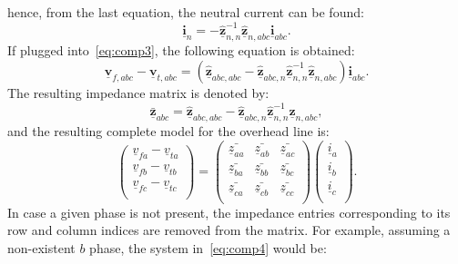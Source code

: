 \documentclass[11pt]{article}
\begin{document}
	hence, from the last equation, the neutral current can be found:
	\begin{equation}
		\underline{\bm{i}}_n = - \underline{\hat{\bm{z}}}_{n,n}^{-1} \underline{\hat{\bm{z}}}_{n,abc} \underline{\bm{i}}_{abc}.
	\end{equation}
	If plugged into~\eqref{eq:comp3}, the following equation is obtained:
	\begin{equation}
		\underline{\bm{v}}_{f,abc} - \underline{\bm{v}}_{t,abc} = (\underline{\hat{\bm{z}}}_{abc,abc}  - \underline{\hat{\bm{z}}}_{abc,n} \underline{\hat{\bm{z}}}_{n,n}^{-1} \underline{\hat{\bm{z}}}_{n,abc}) \underline{\bm{i}}_{abc}.
	\end{equation}
	The resulting impedance matrix is denoted by:
	\begin{equation}
		\bar{\underline{\bm{z}}}_{abc} = \underline{\hat{\bm{z}}}_{abc,abc}  - \underline{\hat{\bm{z}}}_{abc,n} \underline{\hat{\bm{z}}}_{n,n}^{-1} \underline{\hat{\bm{z}}}_{n,abc},
	\end{equation}
	and the resulting complete model for the overhead line is:
	\begin{equation}
		\begin{pmatrix}
			\underline{v}_{fa} - \underline{v}_{ta} \\
			\underline{v}_{fb} - \underline{v}_{tb} \\
			\underline{v}_{fc} - \underline{v}_{tc} \\
		\end{pmatrix}
		= 
		\begin{pmatrix}
			\bar{\underline{z}_{aa}} & \bar{\underline{z}_{ab}} & \bar{\underline{z}_{ac}} \\
			\bar{\underline{z}_{ba}} & \bar{\underline{z}_{bb}} & \bar{\underline{z}_{bc}} \\
			\bar{\underline{z}_{ca}} & \bar{\underline{z}_{cb}} & \bar{\underline{z}_{cc}} \\
		\end{pmatrix}	
		\begin{pmatrix}
			\underline{i}_a \\
			\underline{i}_b \\
			\underline{i}_c \\
		\end{pmatrix}.
		\label{eq:comp4}
	\end{equation}	
	In case a given phase is not present, the impedance entries corresponding to its row and column indices are removed from the matrix. For example, assuming a non-existent $b$ phase, the system in~\eqref{eq:comp4} would be:
\end{document}
